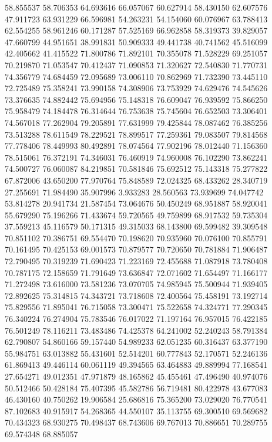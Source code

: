 58.855537
58.706353
64.693616
66.057067
60.627914
58.430150
62.607576
47.911723
63.931229
66.596981
54.263231
54.154060
60.076967
63.788413
62.554255
58.961246
60.171287
57.525169
66.962858
58.319373
39.829057
47.660799
44.951651
38.991831
50.909333
49.441738
40.741562
45.516099
42.405662
41.415522
71.800786
71.892101
70.355078
71.528229
69.251057
70.219870
71.053547
70.412437
71.090853
71.320627
72.540830
71.770731
74.356779
74.684459
72.095689
73.006110
70.862969
71.732390
73.445110
72.725489
75.358241
73.990158
74.308906
73.753929
74.629476
74.545626
73.376635
74.882442
75.694956
75.148318
76.609047
76.939592
75.866250
75.958479
74.184478
76.314644
76.753638
75.745604
76.652503
73.306401
74.567018
77.262904
79.205891
77.631999
79.425844
78.087462
76.385256
73.513288
78.611549
78.229521
78.899517
77.259361
79.083507
79.814568
77.778406
78.449993
80.492891
78.074564
77.902196
78.012440
71.156360
78.515061
76.372191
74.346031
76.460919
74.960008
76.102290
73.862241
74.500727
76.060087
84.219851
70.581846
75.692512
75.143318
75.277822
67.872006
43.650200
77.970764
75.848589
72.024325
68.433262
28.340719
27.255691
71.984490
35.907996
3.933283
28.560563
73.939699
74.047742
53.814278
20.941734
21.587454
73.064676
50.450249
68.951887
58.920041
55.679290
75.196266
71.433674
59.720565
49.759899
68.917532
59.735304
37.559213
45.116579
50.171315
49.315033
68.143800
69.599482
39.309548
70.851102
70.386751
69.554470
70.198620
70.935960
70.076100
70.855791
70.161495
70.425153
69.001573
70.879577
70.720650
70.781884
71.906487
72.790495
70.319239
71.690423
71.223169
72.455688
71.087918
73.780408
70.787175
72.158659
71.791649
73.636847
72.071602
71.654497
71.166177
71.272498
73.616000
73.581236
73.070705
74.985945
75.500944
71.939405
72.892625
75.314815
74.343721
73.718608
72.400564
75.458191
73.192714
75.829556
71.895041
76.715058
73.300471
75.522658
74.324771
77.290345
76.340224
76.274904
75.783546
76.017022
71.197164
76.957015
76.422185
76.501249
78.116211
73.483486
74.425378
64.241002
52.240243
58.791384
62.790807
54.860166
59.157440
54.989233
62.051235
60.316437
63.377190
55.984751
63.013882
55.431601
52.514201
60.777843
52.170571
52.246136
61.869413
49.446114
60.061119
49.394565
63.464883
49.889994
77.168541
27.654271
49.012351
47.971879
48.165862
45.455461
47.496490
40.974076
50.512466
50.428184
75.407395
45.582786
56.719481
80.422978
43.677083
46.430160
40.750262
19.906584
25.686816
75.365200
73.029020
76.770541
87.102683
40.915917
54.268365
44.550107
35.113755
69.300510
69.569682
70.434323
68.930275
70.498437
68.743606
69.767013
70.886651
70.289755
69.574348
68.885057
